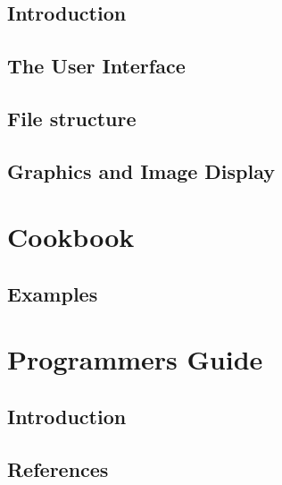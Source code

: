 \chapter                {Introduction}
 
\cleardoublepage
\chapter                {The User Interface}
 
\cleardoublepage
\chapter                {File structure}

\cleardoublepage
\chapter                {Graphics and Image Display}
 
\part{Cookbook}
\cleardoublepage
\chapter                {Examples}
 	
\part{Programmers Guide}
\chapter                {Introduction}
 
\cleardoublepage
\chapter                {References}
 
\appendix
\cleardoublepage
